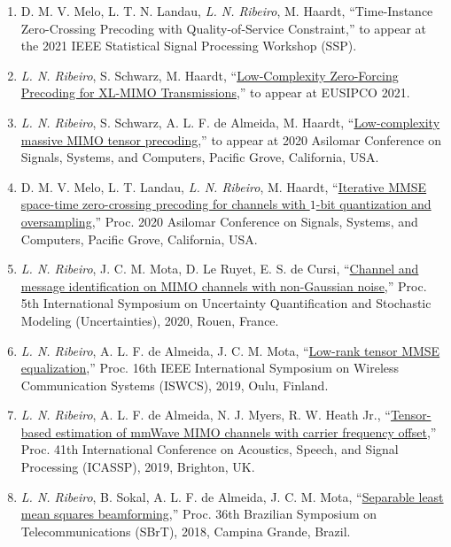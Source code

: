 \begin{enumerate}
	\item D. M. V. Melo, L. T. N. Landau, \emph{L. N. Ribeiro}, M. Haardt, ``Time-Instance Zero-Crossing Precoding with Quality-of-Service Constraint,'' to appear at the 2021 IEEE Statistical Signal Processing Workshop (SSP).

	\item \emph{L. N. Ribeiro}, S. Schwarz, M. Haardt, ``\href{https://arxiv.org/abs/2103.00971}{Low-Complexity Zero-Forcing Precoding for XL-MIMO Transmissions},'' to appear at EUSIPCO 2021.

	\item \emph{L. N. Ribeiro}, S. Schwarz, A. L. F. de Almeida, M. Haardt, ``\href{https://ieeexplore.ieee.org/abstract/document/9443492}{Low-complexity massive MIMO tensor precoding},'' to appear at 2020 Asilomar Conference on Signals, Systems, and Computers, Pacific Grove, California, USA.

	\item D. M. V. Melo, L. T. Landau, \emph{L. N. Ribeiro}, M. Haardt, ``\href{https://ieeexplore.ieee.org/abstract/document/9443574}{Iterative MMSE space-time zero-crossing precoding for channels with $1$-bit quantization and oversampling},'' Proc. 2020 Asilomar Conference on Signals, Systems, and Computers, Pacific Grove, California, USA.

	\item \emph{L. N. Ribeiro}, J. C. M. Mota, D. Le Ruyet, E. S. de Cursi, ``\href{https://www5.tu-ilmenau.de/nt/generic/paper_pdfs/Ribeiro2020.pdf}{Channel and message identification on MIMO channels with non-Gaussian noise},'' Proc. 5th International Symposium on Uncertainty Quantification and Stochastic Modeling (Uncertainties), 2020, Rouen, France.
	
	\item \emph{L. N. Ribeiro}, A. L. F. de Almeida, J. C. M. Mota, ``\href{https://arxiv.org/abs/1912.08317}{Low-rank tensor MMSE equalization},'' Proc. 16th IEEE International Symposium on Wireless Communication Systems (ISWCS), 2019, Oulu, Finland.
	
	\item \emph{L. N. Ribeiro}, A. L. F. de Almeida, N. J. Myers, R. W. Heath Jr., ``\href{https://doi.org/10.1109/ICASSP.2019.8683496}{Tensor-based estimation of mmWave MIMO channels with carrier frequency offset},'' Proc. 41th International Conference on Acoustics, Speech, and Signal Processing (ICASSP), 2019, Brighton, UK.
	
	\item \emph{L. N. Ribeiro}, B. Sokal, A. L. F. de Almeida, J. C. M. Mota, ``\href{https://github.com/lnribeiro/lnribeiro.github.io/blob/master/assets/pdf/sbrt18.pdf}{Separable least mean squares beamforming},'' Proc. 36th Brazilian Symposium on Telecommunications (SBrT), 2018, Campina Grande, Brazil.
	

\end{enumerate}
